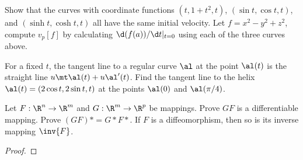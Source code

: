 \begin{exercise}[1.4.7]
    Show that the curves with coordinate functions $(t,1+{t}^{2},t)$, $(\sin t,\cos t,t)$, and $(\sinh t,\cosh t,t)$ all have the same initial velocity. Let $f={x}^{2}-{y}^{2}+{z}^{2}$, compute ${v}_{p}[f]$ by calculating $\d(f(a))/\d t{\vert}_{t=0}$ using each of the three curves above.
\end{exercise}

\begin{exercise}[1.4.9]
    For a fixed $t$, the tangent line to a regular curve $\al$ at the point $\al(t)$ is the straight line $u\mt\al(t)+u\al'(t)$. Find the tangent line to the helix $\al(t)=(2\cos t, 2\sin t,t)$ at the points $\al(0)$ and $\al(\pi/4)$.
\end{exercise}




\begin{exercise}[1.7.9]
    Let $F:{\R}^{n}\to{\R}^{m}$ and $G:{\R}^{m}\to{\R}^{p}$ be mappings. Prove $GF$ is a differentiable mapping. Prove $(GF)*=G*F*$. If $F$ is a diffeomorphism, then so is its inverse mapping $\inv{F}$.
\end{exercise}
\begin{proof}
    
\end{proof}